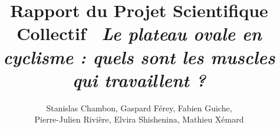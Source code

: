 \documentclass[12pt,a4paper]{article}
\title{\textbf{Rapport du Projet Scientifique Collectif}\
\smallbreak
\emph{Le plateau ovale en cyclisme : quels sont les muscles qui travaillent ?}}
\author{Stanislas Chambon, Gaspard Férey, Fabien Guiche,\\ Pierre-Julien Rivière, Elvira Shishenina, Mathieu Xémard\\}
\begin{document}
\maketitle
\date

\tableofcontents
\pagebreak
\end{document}
